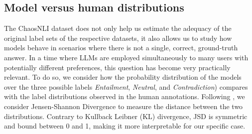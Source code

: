 % 
% 


\subsection{Model versus human distributions}\label{subsec:chaosnli_dist}
The ChaosNLI dataset does not only help us estimate the adequacy of the original label sets of the respective datasets, it also allows us to study how models behave in scenarios where there is not a single, correct, ground-truth answer.
In a time where LLMs are employed simultaneously to many users with potentially different preferences, this question has become very practically relevant.
To do so, we consider how the probability distribution of the models over the three possible labels \textit{Entailment}, \textit{Neutral}, and \textit{Contradiction}) compares with the label distributions observed in the human annotations.
Following \citet{nie-etal-2020-learn}, we consider Jensen-Shannon Divergence \citep[JSD][]{menendez1997jensen} to measure the distance between the two distributions. 
%
%
Contrary to Kullback Leibner (KL) divergence, JSD is symmetric and bound between 0 and 1, making it more interpretable for our specific case.


